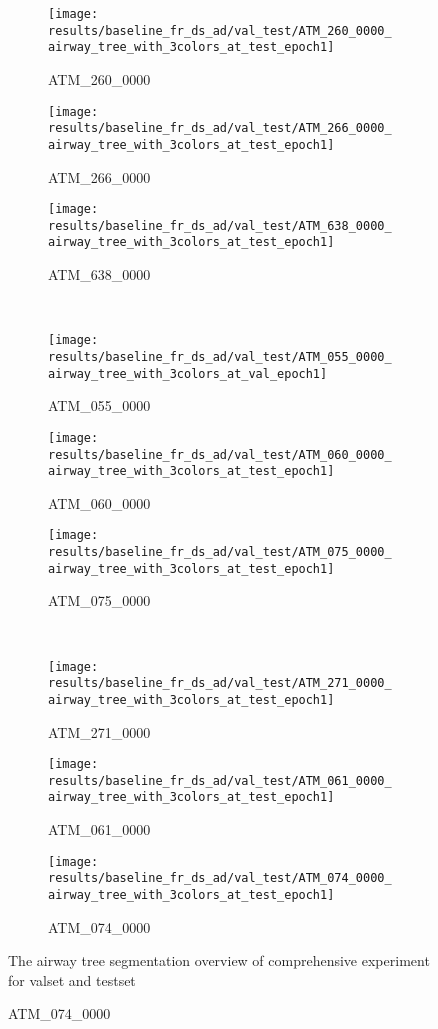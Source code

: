 \begin{figure}[!ht]
	\centering
	\begin{subfigure}{0.325\textwidth}
		\texttt{[image: results/baseline\_fr\_ds\_ad/val\_test/ATM\_260\_0000\_airway\_tree\_with\_3colors\_at\_test\_epoch1]}
		\caption{ATM\_260\_0000}
	\end{subfigure}
	\hfill
	\begin{subfigure}{0.325\textwidth}
		\texttt{[image: results/baseline\_fr\_ds\_ad/val\_test/ATM\_266\_0000\_airway\_tree\_with\_3colors\_at\_test\_epoch1]}
		\caption{ATM\_266\_0000}
	\end{subfigure}
	\hfill
	\begin{subfigure}{0.325\textwidth}
		\texttt{[image: results/baseline\_fr\_ds\_ad/val\_test/ATM\_638\_0000\_airway\_tree\_with\_3colors\_at\_test\_epoch1]}
		\caption{ATM\_638\_0000}
	\end{subfigure}
	\\
	\begin{subfigure}{0.325\textwidth}
		\texttt{[image: results/baseline\_fr\_ds\_ad/val\_test/ATM\_055\_0000\_airway\_tree\_with\_3colors\_at\_val\_epoch1]}
		\caption{ATM\_055\_0000}
	\end{subfigure}
	\hfill
	\begin{subfigure}{0.325\textwidth}
		\texttt{[image: results/baseline\_fr\_ds\_ad/val\_test/ATM\_060\_0000\_airway\_tree\_with\_3colors\_at\_test\_epoch1]}
		\caption{ATM\_060\_0000}
	\end{subfigure}
	\hfill
	\begin{subfigure}{0.325\textwidth}
		\texttt{[image: results/baseline\_fr\_ds\_ad/val\_test/ATM\_075\_0000\_airway\_tree\_with\_3colors\_at\_test\_epoch1]}
		\caption{ATM\_075\_0000}
	\end{subfigure}
	\\
	\begin{subfigure}{0.325\textwidth}
		\texttt{[image: results/baseline\_fr\_ds\_ad/val\_test/ATM\_271\_0000\_airway\_tree\_with\_3colors\_at\_test\_epoch1]}
		\caption{ATM\_271\_0000}
	\end{subfigure}
	\hfill
	\begin{subfigure}{0.325\textwidth}
		\texttt{[image: results/baseline\_fr\_ds\_ad/val\_test/ATM\_061\_0000\_airway\_tree\_with\_3colors\_at\_test\_epoch1]}
		\caption{ATM\_061\_0000}
	\end{subfigure}
	\hfill
	\begin{subfigure}{0.325\textwidth}
		\texttt{[image: results/baseline\_fr\_ds\_ad/val\_test/ATM\_074\_0000\_airway\_tree\_with\_3colors\_at\_test\_epoch1]}
		\caption{ATM\_074\_0000}
	\end{subfigure}
        {The airway tree segmentation overview of comprehensive experiment for valset and testset}
    \label{fig:airway_segmentation_overview}
\end{figure}
